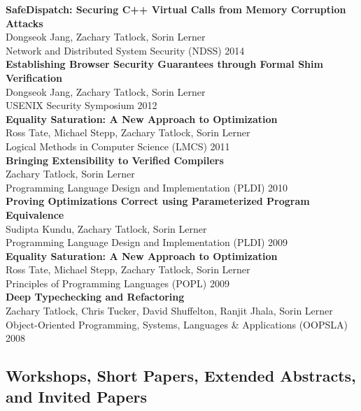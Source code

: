 \documentclass[10pt]{article}
\begin{document}
\textbf{%
SafeDispatch: Securing C++ Virtual Calls from Memory Corruption Attacks
} \\
Dongseok Jang, Zachary Tatlock, Sorin Lerner \\
Network and Distributed System Security (NDSS) 2014 \\

\textbf{%
Establishing Browser Security Guarantees through Formal Shim Verification
} \\
Dongseok Jang, Zachary Tatlock, Sorin Lerner \\
USENIX Security Symposium 2012 \\

\textbf{%
Equality Saturation: A New Approach to Optimization
} \\
Ross Tate, Michael Stepp, Zachary Tatlock, Sorin Lerner \\
Logical Methods in Computer Science (LMCS) 2011 \\

\textbf{%
Bringing Extensibility to Verified Compilers
} \\
Zachary Tatlock, Sorin Lerner \\
Programming Language Design and Implementation (PLDI) 2010 \\

\textbf{%
Proving Optimizations Correct using Parameterized Program Equivalence
} \\
Sudipta Kundu, Zachary Tatlock, Sorin Lerner \\
Programming Language Design and Implementation (PLDI) 2009 \\

\textbf{%
Equality Saturation: A New Approach to Optimization
} \\
Ross Tate, Michael Stepp, Zachary Tatlock, Sorin Lerner \\
Principles of Programming Languages (POPL) 2009 \\

\textbf{%
Deep Typechecking and Refactoring
} \\
Zachary Tatlock, Chris Tucker, David Shuffelton, Ranjit Jhala, Sorin Lerner \\
Object-Oriented Programming, Systems, Languages \& Applications (OOPSLA) 2008 \\


\subsection*{Workshops, Short Papers, Extended Abstracts, and Invited Papers}
\end{document}
